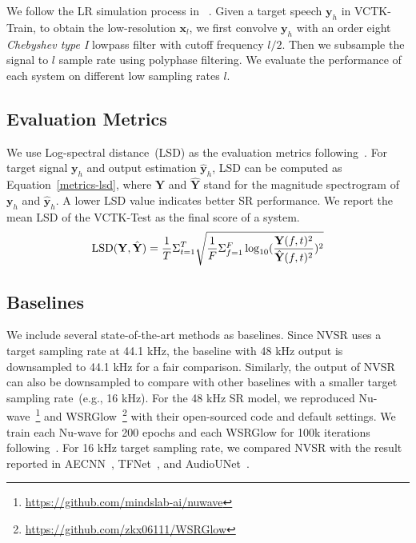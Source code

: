 \documentclass[a4paper]{article}
\def\Eqref#1{Equation~\ref{#1}}
\def\vx{{\mathbf{x}}}
\def\vy{{\mathbf{y}}}
\def\mY{{\mathbf{Y}}}
\begin{document}
We follow the LR simulation process in ~\cite{audio-supre-resolution-SR-kuleshov2017audio,heming-towards-sr-wang2021towards}.
Given a target speech $\vy_{h}$ in VCTK-Train, to obtain the low-resolution $\vx_{l}$, we first convolve $\vy_{h}$ with an order eight \textit{Chebyshev type I} lowpass filter with cutoff frequency $l/2$. Then we subsample the signal to $l$ sample rate using polyphase filtering. We evaluate the performance of each system on different low sampling rates $l$.

\subsection{Evaluation Metrics}

We use Log-spectral distance~(LSD) as the evaluation metrics following~\cite{heming-towards-sr-wang2021towards, nu-wave-lee2021nu, nu-gan-kumar2020nu}. For target signal $\vy_{h}$ and output estimation $\hat{\vy}_{h}$, LSD can be computed as \Eqref{metrics-lsd}, where $\mY$ and $\hat{\mY}$ stand for the magnitude spectrogram of $\vy_{h}$ and $\hat{\vy}_{h}$. A lower LSD value indicates better SR performance. We report the mean LSD of the VCTK-Test as the final score of a system. 
\begin{equation}
    \label{metrics-lsd}
    \vspace{-1.0em}
    \mathrm{LSD}(\mY,\hat{\mY}) = \frac{1}{T}\Sigma_{t=1}^{T}\sqrt{\frac{1}{F}\Sigma_{f=1}^{F}\log_{10}(\frac{\mY(f,t)^2}{\hat{\mY}(f,t)^2})^2}
\end{equation}


\subsection{Baselines}
We include several state-of-the-art methods as baselines. Since NVSR uses a target sampling rate at 44.1 kHz, the baseline with 48 kHz output is downsampled to 44.1 kHz for a fair comparison. Similarly, the output of NVSR can also be downsampled to compare with other baselines with a smaller target sampling rate~(e.g., 16 kHz). For the 48 kHz SR model, we reproduced Nu-wave~\footnote{\url{https://github.com/mindslab-ai/nuwave}} and WSRGlow~\footnote{\url{https://github.com/zkx06111/WSRGlow}} with their open-sourced code and default settings. We train each Nu-wave for \num{200} epochs and each WSRGlow for 100k iterations following~\cite{zhang2021wsrglow}. For \num{16} kHz target sampling rate, we compared NVSR with the result reported in AECNN~\cite{heming-towards-sr-wang2021towards}, TFNet~\cite{tf-network-sr-lim2018time}, and AudioUNet~\cite{audio-supre-resolution-SR-kuleshov2017audio}.
\end{document}
